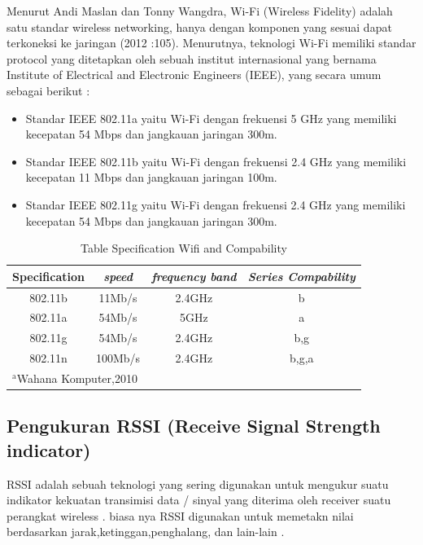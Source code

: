 \documentclass[conference]{IEEEtran}
\begin{document}
Menurut Andi Maslan dan Tonny Wangdra, Wi-Fi (Wireless Fidelity) adalah
satu standar wireless networking, hanya dengan komponen yang sesuai dapat
terkoneksi ke jaringan (2012 :105). Menurutnya, teknologi Wi-Fi memiliki standar
protocol yang ditetapkan oleh sebuah institut internasional yang bernama Institute of
Electrical and Electronic Engineers (IEEE), yang secara umum sebagai berikut : 

\begin{itemize}
    \item Standar IEEE 802.11a yaitu Wi-Fi dengan frekuensi 5 GHz yang memiliki
    kecepatan 54 Mbps dan jangkauan jaringan 300m. 
    \item Standar IEEE 802.11b yaitu Wi-Fi dengan frekuensi 2.4 GHz yang memiliki
    kecepatan 11 Mbps dan jangkauan jaringan 100m. 
    \item Standar IEEE 802.11g yaitu Wi-Fi dengan frekuensi 2.4 GHz yang memiliki
    kecepatan 54 Mbps dan jangkauan jaringan 300m.
\end{itemize}

\begin{table}[htbp]
    \caption{Table Specification Wifi and Compability}
    \begin{center}
    \begin{tabular}{|c|c|c|c|}
        \hline
    \textbf{Specification} & \textbf{\textit{speed}}& \textbf{\textit{frequency band}}& \textbf{\textit{Series Compability}} \\
    \hline
    802.11b & 11Mb/s & 2.4GHz & b  \\
    \hline
    802.11a & 54Mb/s & 5GHz & a  \\
    \hline
    802.11g & 54Mb/s & 2.4GHz & b,g  \\
    \hline
    802.11n & 100Mb/s & 2.4GHz & b,g,a  \\
    \hline
    \multicolumn{4}{l}{$^{\mathrm{a}}$Wahana Komputer,2010}
    \end{tabular}
    \label{tab1}
    \end{center}
    \end{table}


\subsection{Pengukuran RSSI (Receive Signal Strength indicator)}
RSSI adalah sebuah teknologi yang sering digunakan untuk mengukur suatu indikator kekuatan transimisi
data / sinyal yang diterima oleh receiver suatu perangkat wireless . biasa nya RSSI digunakan untuk memetakn
nilai berdasarkan jarak,ketinggan,penghalang, dan lain-lain . 
\end{document}
